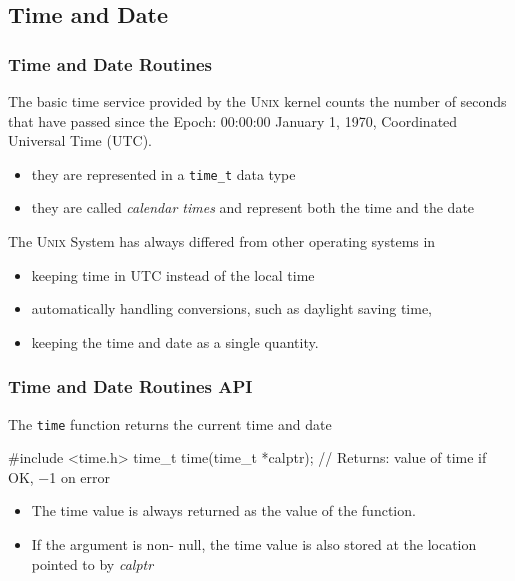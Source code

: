 \documentclass[newPxFont,sthlmFooter,nooffset]{beamer}
\begin{document}
\subsection{Time and Date}

\begin{frame}[t]
  \frametitle{Time and Date Routines}
The basic time service provided by the \textsc{Unix} kernel counts the number of seconds that have passed since the Epoch: 00:00:00 January 1, 1970, Coordinated Universal Time (UTC).
\begin{itemize}
\item they are represented in a \texttt{time\_t} data type
\item they are called \textit{calendar times} and represent both the time and the date
\end{itemize}



The \textsc{Unix} System has always differed from other operating systems in
\begin{itemize}
\item keeping time in UTC instead of the local time
\item automatically handling conversions, such as daylight saving time,
\item keeping the time and date as a single quantity.
\end{itemize}


\end{frame}

\begin{frame}[containsverbatim,t]
  \frametitle{Time and Date Routines API}
The \texttt{time} function returns the current time and date
\begin{codedef}
#include <time.h>
time_t time(time_t *calptr);
// Returns: value of time if OK, −1 on error
\end{codedef}
\begin{itemize}
\item The time value is always returned as the value of the
  function.
\item If the argument is non- null, the time value is also
  stored at the location pointed to by \textit{calptr}
\end{itemize}
\end{frame}
\end{document}
